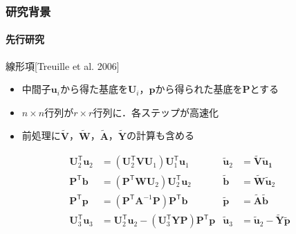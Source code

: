 \documentclass[aspectratio=169,dvipdfmx,hyperref={bookmarks=true}]{beamer}
\begin{document}
\begin{frame}
\frametitle{研究背景}
\framesubtitle{先行研究}
	\begin{block}{線形項[Treuille et al. 2006]}
	   \begin{itemize}
   	\item 中間子$\bm{u}_i$から得た基底を$\bm{U}_i$，$\bm{p}$から得られた基底を$\bm{P}$とする
	\item $n\times n$行列が$r \times r$行列に．各ステップが高速化
	\item 前処理に$\bm{\widetilde{V}}$，$\bm{\widetilde{W}}$，$\bm{\widetilde{A}}$，$\bm{\widetilde{Y}}$の計算も含める
	\end{itemize}
\begin{align*}
 \bm{U}_2^{\mathsf T}\bm{u}_2	& = (\bm{U}_2^{\mathsf T}\bm{V}\bm{U}_1)\bm{U}_1^{\mathsf T}\bm{u}_1 					&\bm{\widetilde{u}}_2 		&= \bm{\widetilde{V}}\bm{\widetilde{u}_1}	\\
 \bm{P}^{\mathsf T}\bm{b}		& = (\bm{P}^{\mathsf T}\bm{W}\bm{U}_2)\bm{U}_2^{\mathsf T}\bm{u}_2        				&\bm{\widetilde{b}}			&= \bm{\widetilde{W}}\bm{\widetilde{u}}_2	\\
 \bm{P}^{\mathsf T}\bm{p} 		&= (\bm{P}^{\mathsf T}\bm{A}^{-1}\bm{P})\bm{P}^{\mathsf T}\bm{b}						&\bm{\widetilde{p}}			&= \bm{\widetilde{A}}\bm{\widetilde{b}}\\
 \bm{U}_3^{\mathsf T}\bm{u}_3 	&=  \bm{U}_2^{\mathsf T}\bm{u}_2 - (\bm{U}_3^{\mathsf T}\bm{Y}\bm{P})\bm{P}^{\mathsf T}\bm{p}	&\bm{\widetilde{u}}_3		&= \bm{\widetilde{u}}_2  -  \bm{\widetilde{Y}}\bm{\widetilde{p}}
\end{align*}
\end{block}

\end{frame}

\end{document}

